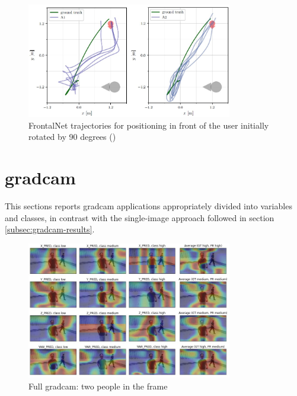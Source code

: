 \begin{figure}[!htb]
	\centering
	\includegraphics[width=0.8\textwidth]{"contents/images/03-frontalnet-trajectories"}
	\caption[FrontalNet trajectories for positioning in front of the user initially rotated by 90 degrees (\cite{mantegazza2019visionbased})]{FrontalNet trajectories for positioning in front of the user initially rotated by 90 degrees (\cite{mantegazza2019visionbased})}
	\label{fig:frontalnet-trajectories}
\end{figure}

\clearpage


\section{\gls{gradcam}}
\label{sec:extra-gradcam}

This sections reports \gls{gradcam} applications appropriately divided into variables and classes, in contrast with the single-image approach followed in section \ref{subsec:gradcam-results}.

\begin{figure}[!h]
	\centering
	\includegraphics[width=0.8\textwidth]{"contents/images/gradcam/apx-gradcam-1"}
	\caption[Full \gls{gradcam}: two people in the frame]{Full \gls{gradcam}: two people in the frame}
	\label{fig:apx-gradcam-1}
\end{figure}

